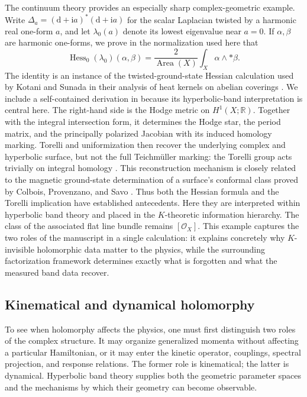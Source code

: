 \documentclass[11pt]{article}
\theoremstyle{definition}
\theoremstyle{remark}
\newcommand{\RR}{\mathbb R}
\newcommand{\cO}{\mathcal O}
\newcommand{\dd}{\mathrm d}
\newcommand{\ii}{\mathrm i}
\begin{document}
The continuum theory provides an especially sharp complex-geometric example.
Write
\(\Delta_a=(\dd+\ii a)^*(\dd+\ii a)\) for the scalar Laplacian twisted by a
harmonic real one-form \(a\), and let \(\lambda_0(a)\) denote its lowest
eigenvalue near \(a=0\).  If \(\alpha,\beta\) are harmonic one-forms, we prove
in the normalization used here that
\[
 \operatorname{Hess}_0(\lambda_0)(\alpha,\beta)
   =\frac{2}{\operatorname{Area}(X)}
      \int_X\alpha\wedge *\beta .
\tag{1.4}\label{eq:intro-hodge-hessian}
\]
The identity is an instance of the twisted-ground-state Hessian calculation
used by Kotani and Sunada in their analysis of heat kernels on abelian
coverings \cite{KotaniSunada2000}.  We include a self-contained derivation in
 because its hyperbolic-band interpretation is central
here.  The right-hand side is the Hodge metric on \(H^1(X;\RR)\).  Together
with the integral intersection form, it determines the Hodge star, the period
matrix, and the principally polarized Jacobian with its induced homology
marking.  Torelli and uniformization then recover the underlying complex and
hyperbolic surface, but not the full Teichm\"uller marking: the Torelli group
acts trivially on integral homology \cite{FarbMargalit}.  This reconstruction
mechanism is closely related to the magnetic ground-state determination of a
surface's conformal class proved by Colbois, Provenzano, and Savo
\cite{ColboisProvenzanoSavo2025}.  Thus both the Hessian formula and the
Torelli implication have established antecedents.  Here they are interpreted
within hyperbolic band theory and placed in the \(K\)-theoretic information
hierarchy.  The class of the associated flat line bundle remains
\([\cO_X]\).  This example captures the two roles of the manuscript in a
single calculation: it explains concretely why \(K\)-invisible holomorphic
data matter to the physics, while the surrounding factorization framework
determines exactly what is forgotten and what the measured band data recover.

\subsection{Kinematical and dynamical holomorphy}

To see when holomorphy affects the physics, one must first distinguish two
roles of the complex structure.  It may organize generalized momenta without
affecting a particular Hamiltonian, or it may enter the kinetic operator,
couplings, spectral projection, and response relations.  The former role is
kinematical; the latter is dynamical.  Hyperbolic band theory supplies both
the geometric parameter spaces and the mechanisms by which their geometry can
become observable.
\end{document}
